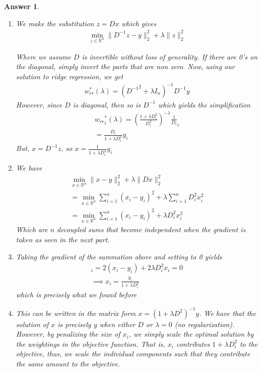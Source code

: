 \documentclass[12pt]{article}
\theoremstyle{colon}
\newtheorem*{answer}{Answer}
\begin{document}
\begin{answer}
  \

  \begin{enumerate}[label=\alph*)]
    \item We make the substitution $z = D x$ which gives
      \begin{gather*}
        \min_{z \in \mathbb{R}^n} \lVert D^{-1} z - y \rVert_2^2 + \lambda \lVert z \rVert_2^2
      \end{gather*}

      Where we assume $D$ is invertible without loss of generality. If there are 0's on the diagonal, simply invert the parts that are non zero. Now, using our solution to ridge regression, we get
      \begin{gather*}
        w_{rr}^*(\lambda) = ({D^{-1}}^2 + \lambda I_n)^{-1} D^{-1} y
      \end{gather*}
      However, since $D$ is diagonal, then so is $D^{-1}$ which yields the simplification
      \begin{gather*}
        {w_{rr}}_i^*(\lambda) = (\frac{1 + \lambda D_i^2}{D_i^2})^{-1} \frac{1}{D_i} _i \\
        = \frac{D_i}{1 + \lambda D_i^2} y_i
      \end{gather*}
      But, $x = D^{-1} z$, so $x = \frac{1}{1 + \lambda D_i^2} y_i$

    \item We have
      \begin{gather*}
        \min_{x \in \mathbb{R}^n} \lVert x - y \rVert_2^2 + \lambda \lVert D x \rVert_2^2 \\
        = \min_{x \in \mathbb{R}^n} \sum_{i=1}^n (x_i - y_i)^2 + \lambda \sum_{i=1}^n D_i^2 x_i^2 \\
        = \min_{x \in \mathbb{R}^n} \sum_{i=1}^n (x_i - y_i)^2 + \lambda D_i^2 x_i^2
      \end{gather*}
      Which are $n$ decoupled sums that become independent when the gradient is taken as seen in the next part.

    \item Taking the gradient of the summation above and setting to 0 yields
      \begin{gather*}
        [\nabla f(x)]_i = 2(x_i - y_i) + 2 \lambda D_i^2 x_i = 0 \\
        \implies x_i = \frac{y_i}{1 + \lambda D_i^2}
      \end{gather*}
      which is precisely what we found before

    \item This can be written in the matrix form $x = (1 + \lambda D^2)^{-1} y$. We have that the solution of $x$ is precisely $y$ when either $D$ or $\lambda = 0$ (no regularization). However, by penalizing the size of $x_i$, we simply scale the optimal solution by the weightings in the objective function. That is, $x_i$ contributes $1+\lambda D_i^2$ to the objective, thus, we scale the individual components such that they contribute the same amount to the objective.
  \end{enumerate}

\end{answer}
\end{document}

